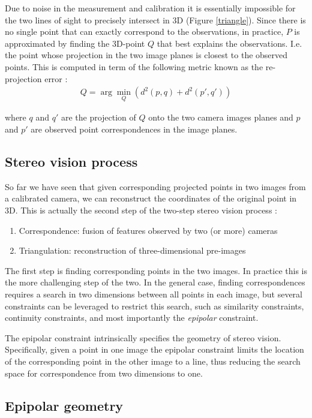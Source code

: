 \documentclass[twoside]{article}
\begin{document}
Due to noise in the measurement and calibration it is essentially impossible for the two lines of sight to precisely intersect in 3D (Figure \ref{triangle}). Since there is no single point that can exactly correspond to the observations, in practice, $P$ is approximated by finding the 3D-point $Q$ that best explains the observations. I.e. the point whose projection in the two image planes is closest to the observed points. This is computed in term of the following metric known as the re-projection error :
\begin{align}
Q = \arg\!\min_Q (d^2(p, q) + d^2(p', q'))
\end{align}

where $q$ and $q'$ are the projection of $Q$ onto the two camera images planes and $p$ and $p'$ are observed point correspondences in the image planes.

\subsection{Stereo vision process}

So far we have seen that given corresponding projected points in two images from a calibrated camera, we can reconstruct the coordinates of the original point in 3D. This is actually the second step of the two-step stereo vision process :

\begin{enumerate}
  \item Correspondence: fusion of features observed by two (or more) cameras
  \item Triangulation: reconstruction of three-dimensional pre-images
\end{enumerate}

The first step is finding corresponding points in the two images. In practice this is the more challenging step of the two. In the general case, finding correspondences requires a search in two dimensions between all points in each image, but several constraints can be leveraged to restrict this search, such as similarity constraints, continuity constraints, and most importantly the \emph{epipolar} constraint.

The epipolar constraint intrinsically specifies the geometry of stereo vision. Specifically, given a point in one image the epipolar constraint limits the location of the corresponding point in the other image to a line, thus reducing the search space for correspondence from two dimensions to one.

\subsection{Epipolar geometry}
\end{document}
